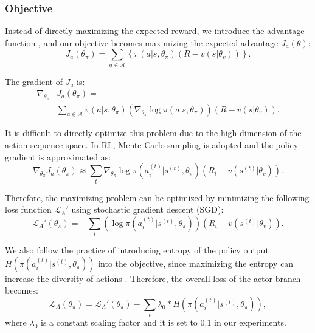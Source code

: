 \documentclass[letterpaper]{article} %
\begin{document}
\subsubsection{Objective}
Instead of directly maximizing the expected reward, we introduce the advantage function \cite{li2017deep}, and our objective becomes maximizing the expected advantage $J_a(\theta)$:
\begin{equation}
J_a(\theta_\pi) = \sum_{{a}\in \mathcal{A}}\left\{\pi(a|s,\theta_\pi)(R-v(s|\theta_v))\right\}.
\end{equation}

The gradient of $J_a$ is:
\begin{equation}
\begin{aligned}
\nabla_{\theta_\pi} & J_a(\theta_\pi) = \\
& \sum_{a \in \mathcal{A}}{\pi(a|s,\theta_\pi)\left(\nabla_{\theta_\pi}{\log\pi(a|s,\theta_\pi)}\right)(R-v(s|\theta_v))}.
\end{aligned}
\end{equation}

It is difficult to directly optimize this problem due to the high dimension of the action sequence space. In RL, Mente Carlo sampling is adopted and the policy gradient is approximated as:
\begin{equation}
\nabla_{\theta_\pi} J_a(\theta_\pi) \approx {\sum_{t}\nabla_{\theta_\pi}{\log{\pi(a_i^{(t)}|s^{(t)},\theta_\pi)}}(R_t-v(s^{(t)}|\theta_v))}.
\end{equation}

Therefore, the maximizing problem can be optimized by minimizing the following loss function $\mathcal{L}_{A}'$ using stochastic gradient descent (SGD):
\begin{equation}
\label{eq:obj1}
\mathcal{L}_{A}'(\theta_\pi) = -{\sum_{t}{\left(\log{\pi(a_i^{(t)}|s^{(t)},\theta_\pi)}\right)}(R_t-v(s^{(t)}|\theta_v))}.
\end{equation}

We also follow the practice of introducing entropy of the policy output $H(\pi(a_i^{(t)}|s^{(t)},\theta_\pi))$ into the objective, since maximizing the entropy can increase the diversity of actions \cite{Li_2018_CVPR}. Therefore, the overall loss of the actor branch becomes:
\begin{equation}
\mathcal{L}_{A}(\theta_\pi) = \mathcal{L}_{A}'(\theta_\pi) - \sum_{t}{{\lambda}_0 * H(\pi(a_i^{(t)}|s^{(t)},\theta_\pi))},
\end{equation}
where $\lambda_0$ is a constant scaling factor and it is set to 0.1 in our experiments.
\end{document}
